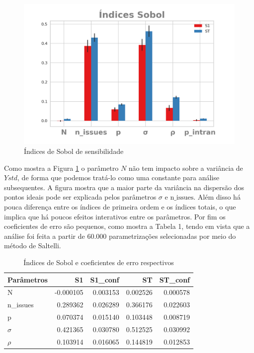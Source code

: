 \begin{figure}[H]
  \centering
  \includegraphics{ims/barplotmuto5k.png}
  \caption{Índices de Sobol de sensibilidade}
  \label{fig:sobol1}
\end{figure}

Como mostra a Figura \ref{fig:sobol1} o parâmetro \(N\) não tem impacto sobre a
variância de \(Ystd\), de forma que podemos tratá-lo como uma constante para
análise subsequentes. A figura mostra que a maior parte da variância na
dispersão dos pontos ideais pode ser explicada pelos parâmetros \(\sigma\) e
\(\text{n\_issues}\). Além disso há pouca diferença entre os índices de primeira
ordem e os índices totais, o que implica que há poucos efeitos interativos entre
os parâmetros. Por fim os coeficientes de erro são pequenos, como mostra a
Tabela 1, tendo em vista que a análise foi feita a partir de 60.000
parametrizações selecionadas por meio do método de Saltelli.


\begin{table}[H]
\centering
\caption{Índices de Sobol e coeficientes de erro respectivos}
\label{my-label}
\begin{tabular}{|l|r|r|r|r|}
\hline
\rowcolor[HTML]{C0C0C0} 
Parâmetros & S1        & S1\_conf & ST       & ST\_conf \\ \hline
N          & -0.000105 & 0.003153 & 0.002526 & 0.000578 \\ \hline
n\_issues  & 0.289362  & 0.026289 & 0.366176 & 0.022603 \\ \hline
p          & 0.070374  & 0.015140 & 0.103448 & 0.008719 \\ \hline
\(\sigma\) & 0.421365  & 0.030780 & 0.512525 & 0.030992 \\ \hline
\(\rho\)   & 0.103914  & 0.016065 & 0.144819 & 0.012853 \\ \hline
\end{tabular}
\end{table}


